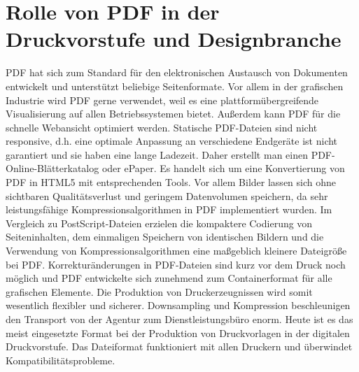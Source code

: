 \section{Rolle von PDF in der Druckvorstufe und Designbranche}
PDF hat sich zum Standard für den elektronischen Austausch von Dokumenten entwickelt und unterstützt beliebige Seitenformate. Vor allem in der grafischen Industrie wird PDF gerne verwendet, weil es eine plattformübergreifende Visualisierung auf allen Betriebssystemen bietet. Außerdem kann PDF für die schnelle Webansicht optimiert werden. Statische PDF-Dateien sind nicht responsive, d.h. eine optimale Anpassung an verschiedene Endgeräte ist nicht garantiert und sie haben eine lange Ladezeit. Daher erstellt man einen PDF-Online-Blätterkatalog oder ePaper. Es handelt sich um eine Konvertierung von PDF in HTML5 mit entsprechenden Tools. Vor allem Bilder lassen sich ohne sichtbaren Qualitätsverlust und geringem Datenvolumen speichern, da sehr leistungsfähige Kompressionsalgorithmen in PDF implementiert wurden. Im Vergleich zu PostScript-Dateien erzielen die kompaktere Codierung von Seiteninhalten, dem einmaligen Speichern von identischen Bildern und die Verwendung von Kompressionsalgorithmen eine maßgeblich kleinere Dateigröße bei PDF. Korrekturänderungen in PDF-Dateien sind kurz vor dem Druck noch möglich und PDF entwickelte sich zunehmend zum Containerformat für alle grafischen Elemente. Die Produktion von Druckerzeugnissen wird somit wesentlich flexibler und sicherer. Downsampling und Kompression beschleunigen den Transport von der Agentur zum Dienstleistungsbüro enorm. Heute ist es das meist eingesetzte Format bei der Produktion von Druckvorlagen in der digitalen Druckvorstufe. Das Dateiformat funktioniert mit allen Druckern und überwindet Kompatibilitätsprobleme. \\
